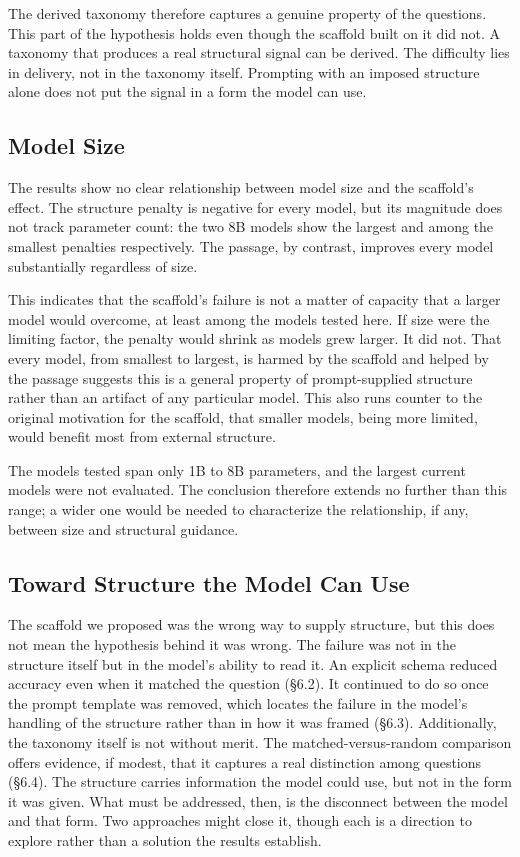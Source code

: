 \documentclass{article}
\begin{document}
The derived taxonomy therefore captures a genuine property of the questions. This part of the hypothesis holds even though the scaffold built on it did not. A taxonomy that produces a real structural signal can be derived. The difficulty lies in delivery, not in the taxonomy itself. Prompting with an imposed structure alone does not put the signal in a form the model can use.

\subsection{Model Size}

The results show no clear relationship between model size and the scaffold's effect. The structure penalty is negative for every model, but its magnitude does not track parameter count: the two 8B models show the largest and among the smallest penalties respectively. The passage, by contrast, improves every model substantially regardless of size.

This indicates that the scaffold's failure is not a matter of capacity that a larger model would overcome, at least among the models tested here. If size were the limiting factor, the penalty would shrink as models grew larger. It did not. That every model, from smallest to largest, is harmed by the scaffold and helped by the passage suggests this is a general property of prompt-supplied structure rather than an artifact of any particular model. This also runs counter to the original motivation for the scaffold, that smaller models, being more limited, would benefit most from external structure.

The models tested span only 1B to 8B parameters, and the largest current models were not evaluated. The conclusion therefore extends no further than this range; a wider one would be needed to characterize the relationship, if any, between size and structural guidance.

\subsection{Toward Structure the Model Can Use}

The scaffold we proposed was the wrong way to supply structure, but this does not mean the hypothesis behind it was wrong. The failure was not in the structure itself but in the model's ability to read it. An explicit schema reduced accuracy even when it matched the question (\S6.2). It continued to do so once the prompt template was removed, which locates the failure in the model's handling of the structure rather than in how it was framed (\S6.3). Additionally, the taxonomy itself is not without merit. The matched-versus-random comparison offers evidence, if modest, that it captures a real distinction among questions (\S6.4). The structure carries information the model could use, but not in the form it was given. What must be addressed, then, is the disconnect between the model and that form. Two approaches might close it, though each is a direction to explore rather than a solution the results establish.
\end{document}
